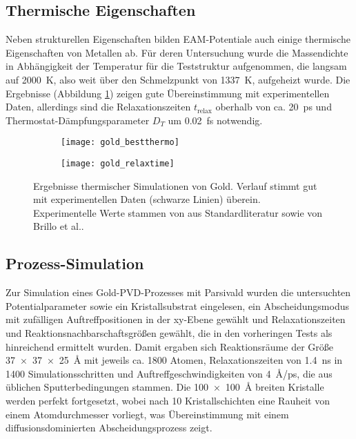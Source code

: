 
\subsection{Thermische Eigenschaften}

Neben strukturellen Eigenschaften bilden EAM-Potentiale auch einige thermische Eigenschaften von Metallen ab.
Für deren Untersuchung wurde die Massendichte in Abhängigkeit der Temperatur für die Teststruktur aufgenommen, die langsam auf \SI{2000}{\kelvin}, also weit über den Schmelzpunkt von \SI{1337}{\kelvin}, aufgeheizt wurde.
Die Ergebnisse (Abbildung \ref{fig:goldthermo}) zeigen gute Übereinstimmung mit experimentellen Daten, allerdings sind die Relaxationszeiten $t_\text{relax}$ oberhalb von ca. \SI{20}{\pico\second} und Thermostat-Dämpfungsparameter $D_T$ um \SI{0.02}{\femto\second} notwendig.

\begin{figure}[tbp]
  \centering
  \captionsetup[subfigure]{singlelinecheck=false}
  \def\subfigwidth{7cm}
  \begin{subfigure}[t]{\subfigwidth}
    \texttt{[image: gold\_bestthermo]}
  \end{subfigure}
  \hfill
  \begin{subfigure}[t]{\subfigwidth}
    \texttt{[image: gold\_relaxtime]}
  \end{subfigure}
  \caption[Ergebnisse thermischer Simulationen von Gold]{Ergebnisse thermischer Simulationen von Gold.
    Verlauf stimmt gut mit experimentellen Daten (schwarze Linien) überein.
    Experimentelle Werte stammen von aus Standardliteratur sowie von Brillo et al.\cite{brillo_density_2006}.
  }
  \label{fig:goldthermo}
\end{figure}

\subsection{Prozess-Simulation}

Zur Simulation eines Gold-PVD-Prozesses mit Parsivald wurden die untersuchten Potentialparameter sowie ein Kristallsubstrat eingelesen, ein Abscheidungsmodus mit zufälligen Auftreffpositionen in der xy-Ebene gewählt und Relaxationszeiten und Reaktionsnachbarschaftsgrößen gewählt, die in den vorheringen Tests als hinreichend ermittelt wurden.
Damit ergaben sich Reaktionsräume der Größe \SI{37x37x25}{\angstrom} mit jeweils ca. 1800 Atomen, Relaxationszeiten von \SI{1.4}{\nano\second} in \SI{1400}{} Simulationsschritten und Auftreffgeschwindigkeiten von \SI{4}{\angstrom/\pico\second}, die aus üblichen Sputterbedingungen stammen.
Die \SI{100x100}{\angstrom} breiten Kristalle werden perfekt fortgesetzt, wobei nach 10 Kristallschichten eine Rauheit von einem Atomdurchmesser vorliegt, was Übereinstimmung mit einem diffusionsdominierten Abscheidungsprozess zeigt.

